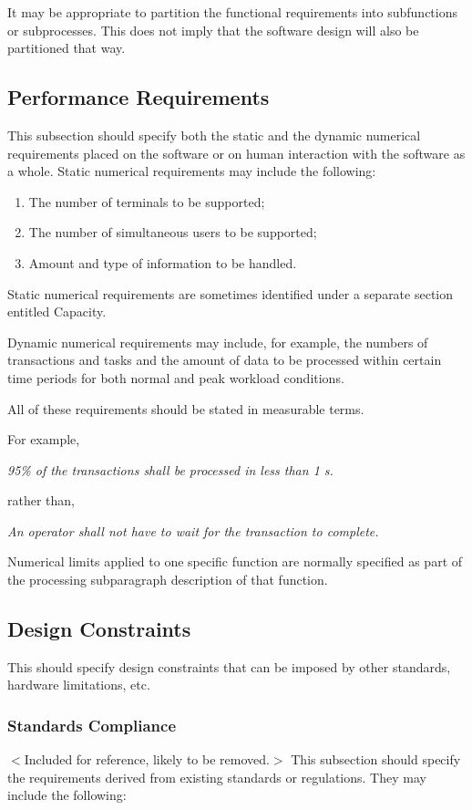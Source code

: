 \documentclass[draftclsnofoot,onecolumn,10pt]{IEEEtran}
\begin{document}
\begin{enumerate}
It may be appropriate to partition the functional requirements into subfunctions
or subprocesses. This does not imply that the software design will also be
partitioned that way.

\subsection{Performance Requirements}
This subsection should specify both the static and the dynamic numerical
requirements placed on the software or on human interaction with the software as
a whole. Static numerical requirements may include the following:

\begin{enumerate}
	\item The number of terminals to be supported;
	\item The number of simultaneous users to be supported;
	\item Amount and type of information to be handled.
\end{enumerate}

Static numerical requirements are sometimes identified under a separate section
entitled Capacity.

Dynamic numerical requirements may include, for example, the numbers of
transactions and tasks and the amount of data to be processed within certain
time periods for both normal and peak workload conditions.

All of these requirements should be stated in measurable terms.

For example,

\textit{95\% of the transactions shall be processed in less than 1 s.}

rather than,

\textit{An operator shall not have to wait for the transaction to complete.}

Numerical limits applied to one specific function are normally specified as part
of the processing subparagraph description of that function.

\subsection{Design Constraints}
This should specify design constraints that can be imposed by other standards,
hardware limitations, etc.

\subsubsection{Standards Compliance}
$<$Included for reference, likely to be removed.$>$
This subsection should specify the requirements derived from existing standards
or regulations. They may include the following:


\end{enumerate}
\end{document}
